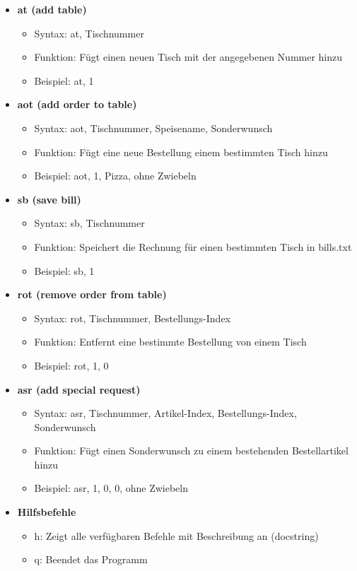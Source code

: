 \documentclass[a4paper,11pt]{article}
\begin{document}
\begin{itemize}
    \item \textbf{at (add table)}
    \begin{itemize}
        \item Syntax: at, Tischnummer
        \item Funktion: Fügt einen neuen Tisch mit der angegebenen Nummer hinzu
        \item Beispiel: at, 1
    \end{itemize}

    \item \textbf{aot (add order to table)}
    \begin{itemize}
        \item Syntax: aot, Tischnummer, Speisename, Sonderwunsch
        \item Funktion: Fügt eine neue Bestellung einem bestimmten Tisch hinzu
        \item Beispiel: aot, 1, Pizza, ohne Zwiebeln
    \end{itemize}

    \item \textbf{sb (save bill)}
    \begin{itemize}
        \item Syntax: sb, Tischnummer
        \item Funktion: Speichert die Rechnung für einen bestimmten Tisch in bills.txt
        \item Beispiel: sb, 1
    \end{itemize}

    \item \textbf{rot (remove order from table)}
    \begin{itemize}
        \item Syntax: rot, Tischnummer, Bestellungs-Index
        \item Funktion: Entfernt eine bestimmte Bestellung von einem Tisch
        \item Beispiel: rot, 1, 0
    \end{itemize}

    \item \textbf{asr (add special request)}
    \begin{itemize}
        \item Syntax: asr, Tischnummer, Artikel-Index, Bestellungs-Index, Sonderwunsch
        \item Funktion: Fügt einen Sonderwunsch zu einem bestehenden Bestellartikel hinzu
        \item Beispiel: asr, 1, 0, 0, ohne Zwiebeln
    \end{itemize}

    \item \textbf{Hilfsbefehle}
    \begin{itemize}
        \item h: Zeigt alle verfügbaren Befehle mit Beschreibung an (docstring)
        \item q: Beendet das Programm
    \end{itemize}
\end{itemize}
\end{document}
